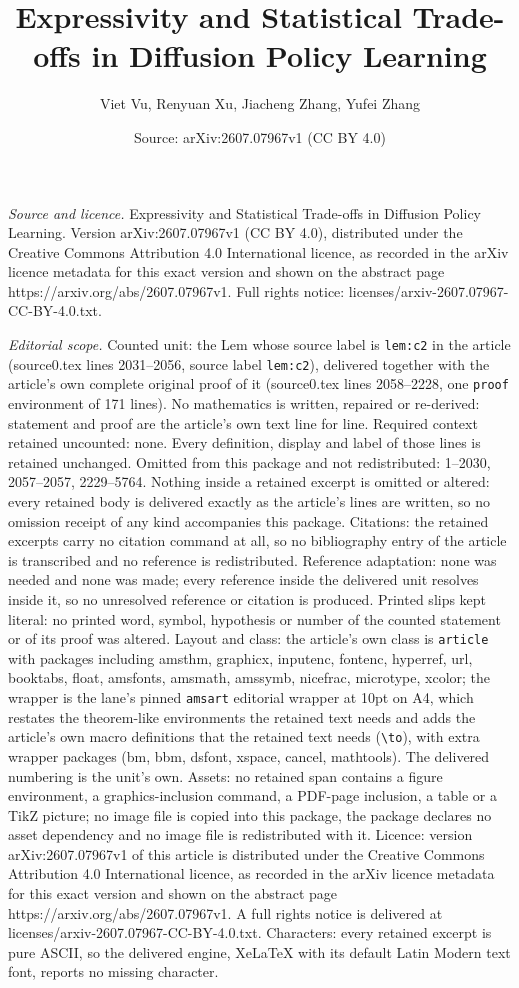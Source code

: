 \documentclass[10pt,a4paper]{amsart}
\title[Expressivity and Statistical Trade-offs in Diffusion Policy ]{Expressivity and Statistical Trade-offs in Diffusion Policy Learning}
\author{Viet Vu, Renyuan Xu, Jiacheng Zhang, Yufei Zhang}
\date{Source: arXiv:2607.07967v1 (CC BY 4.0)}
\begin{document}
\maketitle

\noindent\emph{Source and licence.} Expressivity and Statistical Trade-offs in Diffusion Policy Learning. Version arXiv:2607.07967v1 (CC BY 4.0), distributed under the Creative Commons Attribution 4.0 International licence, as recorded in the arXiv licence metadata for this exact version and shown on the abstract page https://arxiv.org/abs/2607.07967v1. Full rights notice: licenses/arxiv-2607.07967-CC-BY-4.0.txt.\par\smallskip

\noindent\textit{Editorial scope.} Counted unit: the Lem whose source label is \texttt{lem:c2} in the article (source0.tex lines 2031--2056, source label \texttt{lem:c2}), delivered together with the article's own complete original proof of it (source0.tex lines 2058--2228, one \texttt{proof} environment of 171 lines). No mathematics is written, repaired or re-derived: statement and proof are the article's own text line for line. Required context retained uncounted: none. Every definition, display and label of those lines is retained unchanged. Omitted from this package and not redistributed: 1--2030, 2057--2057, 2229--5764. Nothing inside a retained excerpt is omitted or altered: every retained body is delivered exactly as the article's lines are written, so no omission receipt of any kind accompanies this package. Citations: the retained excerpts carry no citation command at all, so no bibliography entry of the article is transcribed and no reference is redistributed. Reference adaptation: none was needed and none was made; every reference inside the delivered unit resolves inside it, so no unresolved reference or citation is produced. Printed slips kept literal: no printed word, symbol, hypothesis or number of the counted statement or of its proof was altered. Layout and class: the article's own class is \texttt{article} with packages including amsthm, graphicx, inputenc, fontenc, hyperref, url, booktabs, float, amsfonts, amsmath, amssymb, nicefrac, microtype, xcolor; the wrapper is the lane's pinned \texttt{amsart} editorial wrapper at 10pt on A4, which restates the theorem-like environments the retained text needs and adds the article's own macro definitions that the retained text needs (\texttt{\textbackslash to}), with extra wrapper packages (bm, bbm, dsfont, xspace, cancel, mathtools). The delivered numbering is the unit's own. Assets: no retained span contains a figure environment, a graphics-inclusion command, a PDF-page inclusion, a table or a TikZ picture; no image file is copied into this package, the package declares no asset dependency and no image file is redistributed with it. Licence: version arXiv:2607.07967v1 of this article is distributed under the Creative Commons Attribution 4.0 International licence, as recorded in the arXiv licence metadata for this exact version and shown on the abstract page https://arxiv.org/abs/2607.07967v1. A full rights notice is delivered at licenses/arxiv-2607.07967-CC-BY-4.0.txt. Characters: every retained excerpt is pure ASCII, so the delivered engine, XeLaTeX with its default Latin Modern text font, reports no missing character.
\end{document}

